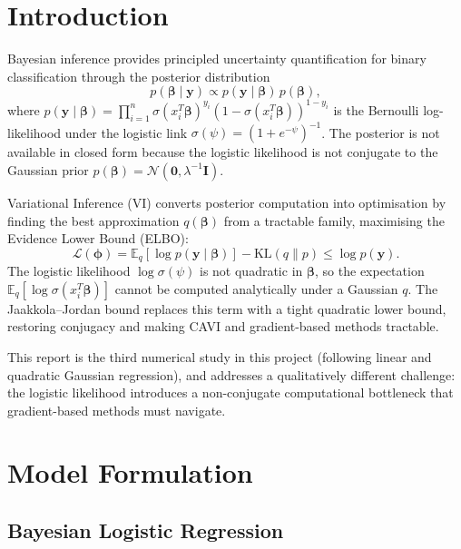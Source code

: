 \documentclass[11pt,a4paper]{article}
\newcommand{\E}{\mathbb{E}}
\newcommand{\N}{\mathcal{N}}
\begin{document}
\section*{Introduction}

Bayesian inference provides principled uncertainty quantification for binary classification
through the posterior distribution
\begin{equation*}
  p(\bm{\beta} \mid \bm{y}) \propto p(\bm{y} \mid \bm{\beta})\,p(\bm{\beta}),
\end{equation*}
where $p(\bm{y}\mid\bm{\beta}) = \prod_{i=1}^{n} \sigma(x_i^T\bm{\beta})^{y_i}
(1-\sigma(x_i^T\bm{\beta}))^{1-y_i}$ is the Bernoulli log-likelihood under the logistic
link $\sigma(\psi)=(1+e^{-\psi})^{-1}$.
The posterior is not available in closed form because the logistic likelihood is not
conjugate to the Gaussian prior $p(\bm{\beta})=\N(\bm{0}, \lambda^{-1}\bm{I})$.

Variational Inference (VI) converts posterior computation into optimisation by finding the
best approximation $q(\bm{\beta})$ from a tractable family, maximising the Evidence Lower
Bound (ELBO):
\begin{equation*}
  \mathcal{L}(\bm{\phi}) = \E_{q}[\log p(\bm{y}\mid\bm{\beta})] - \mathrm{KL}(q \| p)
  \leq \log p(\bm{y}).
\end{equation*}
The logistic likelihood $\log\sigma(\psi)$ is not quadratic in $\bm{\beta}$, so the
expectation $\E_q[\log\sigma(x_i^T\bm{\beta})]$ cannot be computed analytically under
a Gaussian $q$.
The Jaakkola--Jordan bound replaces this term with a tight quadratic lower bound,
restoring conjugacy and making CAVI and gradient-based methods tractable.

This report is the third numerical study in this project (following linear and quadratic
Gaussian regression), and addresses a qualitatively different challenge: the logistic
likelihood introduces a non-conjugate computational bottleneck that gradient-based methods
must navigate.

\section{Model Formulation}

\subsection{Bayesian Logistic Regression}
\end{document}
